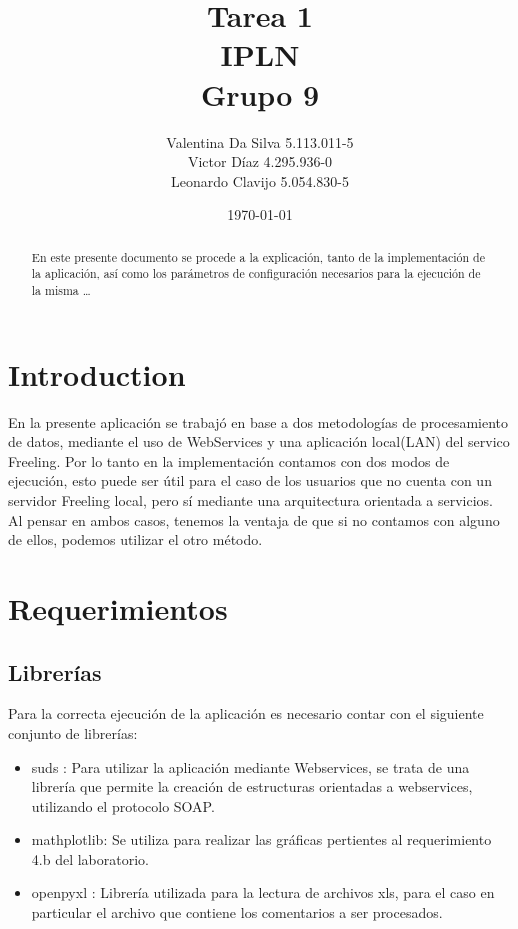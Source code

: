 \documentclass[12pt]{article}
\title{Tarea 1 \\ IPLN \\ Grupo 9}
\author{
  Valentina Da Silva 5.113.011-5\\
  Victor Díaz 4.295.936-0\\
  Leonardo Clavijo 5.054.830-5
}
\date{\today}
\begin{document}
\maketitle

\begin{abstract}
En este presente documento se procede a la explicación, tanto de la implementación de la aplicación, así como los parámetros de configuración necesarios para la ejecución de la misma \ldots
\end{abstract}

\newpage
\tableofcontents
\newpage

\section{Introduction}
En la presente aplicación se trabajó en base a dos metodologías de procesamiento de datos, mediante el uso de WebServices y una aplicación local(LAN) del servico Freeling.
Por lo tanto en la implementación contamos con dos modos de ejecución, esto puede ser útil para el caso de los usuarios que no cuenta con un servidor Freeling local, pero sí mediante una arquitectura orientada a servicios.
Al pensar en ambos casos, tenemos la ventaja de que si no contamos con alguno de ellos, podemos utilizar el otro método.

\section{Requerimientos}

\subsection{Librerías}\label{lib}
Para la correcta ejecución de la aplicación es necesario contar con el siguiente conjunto de librerías:
\begin{itemize}
  \item suds :  Para utilizar la aplicación mediante Webservices, se trata de una librería que permite la creación de estructuras orientadas a webservices, utilizando el protocolo SOAP.
  \item mathplotlib: Se utiliza para realizar las gráficas pertientes al requerimiento 4.b del laboratorio.
  \item openpyxl : Librería utilizada para la lectura de archivos xls, para el caso en particular el archivo que contiene los comentarios a ser procesados.
\end{itemize}
\end{document}
